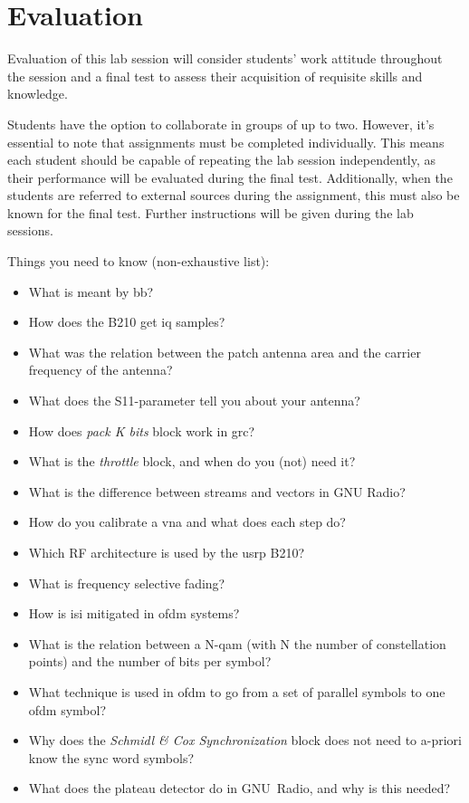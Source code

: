 \chapter{Evaluation}\glsresetall

Evaluation of this lab session will consider students' work attitude throughout the session and a final test to assess their acquisition of requisite skills and knowledge.

Students have the option to collaborate in groups of up to two. However, it's essential to note that assignments must be completed individually. This means each student should be capable of repeating the lab session independently, as their performance will be evaluated during the final test. Additionally, when the students are referred to external sources during the assignment, this must also be known for the final test.
Further instructions will be given during the lab sessions.

Things you need to know (non-exhaustive list):
\begin{itemize}
    \item What is meant by \gls{bb}?
    \item How does the B210 get \gls{iq} samples?
    \item What was the relation between the patch antenna area and the carrier frequency of the antenna?
    \item What does the S11-parameter tell you about your antenna?
    \item How does \textit{pack K bits} block work in \gls{grc}?
    \item What is the \textit{throttle} block, and when do you (not) need it?
    \item What is the difference between streams and vectors in GNU Radio?
    \item How do you calibrate a \gls{vna} and what does each step do?
    \item Which RF architecture is used by the \gls{usrp} B210?
    \item What is frequency selective fading?
    \item How is \gls{isi} mitigated in \gls{ofdm} systems?
    \item What is the relation between a N-\gls{qam} (with N the number of constellation points) and the number of bits per symbol?
    \item What technique is used in \gls{ofdm} to go from a set of parallel symbols to one \gls{ofdm} symbol?  
    \item Why does the \textit{Schmidl \& Cox Synchronization} block does not need to a-priori know the sync word symbols?
    \item What does the plateau detector do in GNU~Radio, and why is this needed?
\end{itemize}
